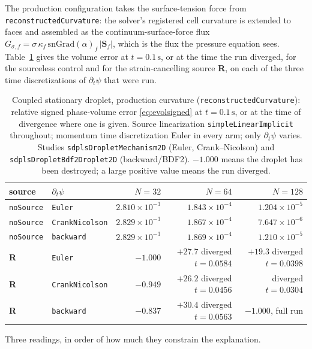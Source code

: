 \documentclass[preprint,3p,11pt]{elsarticle}
\newcommand{\psilev}{\psi}
\begin{document}
The production configuration takes the surface-tension force from
\texttt{reconstructedCurvature}: the solver's registered cell curvature is
extended to faces and assembled as the continuum-surface-force flux
$G_{\sigma,f} = \sigma\,\kappa_f\,\mathrm{snGrad}(\alpha)_f\,|\mathbf{S}_f|$,
which is the flux the pressure equation sees. Table~\ref{tab:coupled-production}
gives the volume error at $t=0.1\,\mathrm{s}$, or at the time the run diverged,
for the sourceless control and for the strain-cancelling source \textbf{R}, on
each of the three time discretizations of $\partial_t\psilev$ that were run.

\begin{table}[htbp]
\centering
\caption{Coupled stationary droplet, production curvature
(\texttt{reconstructedCurvature}): relative signed phase-volume error
\eqref{eq:evolsigned} at $t=0.1\,\mathrm{s}$, or at the time of divergence where
one is given. Source linearization \texttt{simpleLinearImplicit} throughout;
momentum time discretization Euler in every arm; only $\partial_t\psilev$
varies. Studies \texttt{sdplsDropletMechanism2D} (Euler, Crank--Nicolson) and
\texttt{sdplsDropletBdf2Droplet2D} (backward/BDF2). $-1.000$ means the droplet
has been destroyed; a large positive value means the run diverged.}
\label{tab:coupled-production}
\small
\begin{tabular}{llrrr}
\toprule
source & $\partial_t\psilev$ & $N=32$ & $N=64$ & $N=128$ \\
\midrule
\texttt{noSource} & \texttt{Euler}          & $2.810\times10^{-3}$ & $1.843\times10^{-4}$ & $1.204\times10^{-5}$ \\
\texttt{noSource} & \texttt{CrankNicolson}  & $2.829\times10^{-3}$ & $1.867\times10^{-4}$ & $7.647\times10^{-6}$ \\
\texttt{noSource} & \texttt{backward}       & $2.829\times10^{-3}$ & $1.869\times10^{-4}$ & $1.210\times10^{-5}$ \\
\addlinespace
\textbf{R} & \texttt{Euler}         & $-1.000$ & $+27.7$ diverged $t=0.0584$ & $+19.3$ diverged $t=0.0398$ \\
\textbf{R} & \texttt{CrankNicolson} & $-0.949$ & $+26.2$ diverged $t=0.0456$ & diverged $t=0.0304$ \\
\textbf{R} & \texttt{backward}      & $-0.837$ & $+30.4$ diverged $t=0.0563$ & $-1.000$, full run \\
\bottomrule
\end{tabular}
\end{table}

Three readings, in order of how much they constrain the explanation.
\end{document}
